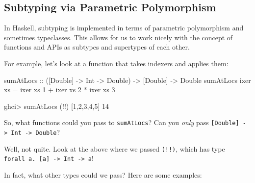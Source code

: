 \documentclass[]{article}
\newenvironment{Shaded}{}{}
\newcommand{\DataTypeTok}[1]{\textcolor[rgb]{0.56,0.13,0.00}{#1}}
\newcommand{\DecValTok}[1]{\textcolor[rgb]{0.25,0.63,0.44}{#1}}
\newcommand{\NormalTok}[1]{#1}
\newcommand{\OperatorTok}[1]{\textcolor[rgb]{0.40,0.40,0.40}{#1}}
\newcommand{\OtherTok}[1]{\textcolor[rgb]{0.00,0.44,0.13}{#1}}
\begin{document}
\subsection{Subtyping via Parametric
Polymorphism}\label{subtyping-via-parametric-polymorphism}

In Haskell, subtyping is implemented in terms of parametric polymorphism and
sometimes typeclasses. This allows for us to work nicely with the concept of
functions and APIs as subtypes and supertypes of each other.

For example, let's look at a function that takes indexers and applies them:

\begin{Shaded}
\begin{Highlighting}[]
\OtherTok{sumAtLocs ::}\NormalTok{ ([}\DataTypeTok{Double}\NormalTok{] }\OtherTok{{-}\textgreater{}} \DataTypeTok{Int} \OtherTok{{-}\textgreater{}} \DataTypeTok{Double}\NormalTok{) }\OtherTok{{-}\textgreater{}}\NormalTok{ [}\DataTypeTok{Double}\NormalTok{] }\OtherTok{{-}\textgreater{}} \DataTypeTok{Double}
\NormalTok{sumAtLocs ixer xs }\OtherTok{=}\NormalTok{ ixer xs }\DecValTok{1} \OperatorTok{+}\NormalTok{ ixer xs }\DecValTok{2} \OperatorTok{*}\NormalTok{ ixer xs }\DecValTok{3}
\end{Highlighting}
\end{Shaded}

\begin{Shaded}
\begin{Highlighting}[]
\NormalTok{ghci}\OperatorTok{\textgreater{}}\NormalTok{ sumAtLocs (}\OperatorTok{!!}\NormalTok{) [}\DecValTok{1}\NormalTok{,}\DecValTok{2}\NormalTok{,}\DecValTok{3}\NormalTok{,}\DecValTok{4}\NormalTok{,}\DecValTok{5}\NormalTok{]}
\DecValTok{14}
\end{Highlighting}
\end{Shaded}

So, what functions could you pass to \texttt{sumAtLocs}? Can you \emph{only}
pass \texttt{{[}Double{]}\ -\textgreater{}\ Int\ -\textgreater{}\ Double}?

Well, not quite. Look at the above where we passed \texttt{(!!)}, which has type
\texttt{forall\ a.\ {[}a{]}\ -\textgreater{}\ Int\ -\textgreater{}\ a}!

In fact, what other types could we pass? Here are some examples:
\end{document}
